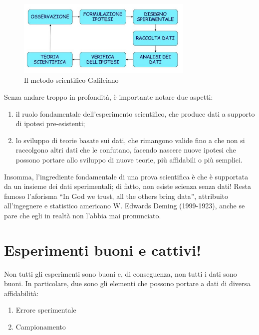 \documentclass[a4paper,12pt,oneside]{book}
\providecommand{\tightlist}{%
  \setlength{\itemsep}{0pt}\setlength{\parskip}{0pt}}
\begin{document}
\begin{figure}
\centering
\includegraphics[width=0.75000\textwidth]{_images/MSAMap.jpg}
\caption{Il metodo scientifico Galileiano}
\end{figure}

Senza andare troppo in profondità, è importante notare due aspetti:

\begin{enumerate}
\def\labelenumi{\arabic{enumi}.}
\tightlist
\item
  il ruolo fondamentale dell'esperimento scientifico, che produce dati a
  supporto di ipotesi pre-esistenti;
\item
  lo sviluppo di teorie basate sui dati, che rimangono valide fino a che
  non si raccolgono altri dati che le confutano, facendo nascere nuove
  ipotesi che possono portare allo sviluppo di nuove teorie, più
  affidabili o più semplici.
\end{enumerate}

Insomma, l'ingrediente fondamentale di una prova scientifica è che è
supportata da un insieme dei dati sperimentali; di fatto, non esiste
scienza senza dati! Resta famoso l'aforisma ``In God we trust, all the
others bring data'', attribuito all'ingegnere e statistico americano W.
Edwards Deming (1999-1923), anche se pare che egli in realtà non l'abbia
mai pronunciato.

\section{Esperimenti buoni e
cattivi!}\label{esperimenti-buoni-e-cattivi}

Non tutti gli esperimenti sono buoni e, di conseguenza, non tutti i dati
sono buoni. In particolare, due sono gli elementi che possono portare a
dati di diversa affidabilità:

\begin{enumerate}
\def\labelenumi{\arabic{enumi}.}
\tightlist
\item
  Errore sperimentale
\item
  Campionamento
\end{enumerate}
\end{document}
